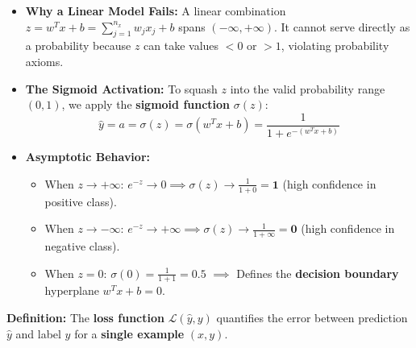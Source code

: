 \documentclass[10pt,a4paper]{article}
\begin{document}
\begin{itemize}[leftmargin=12pt, itemsep=1.5pt, topsep=1pt]
    \item \textbf{Why a Linear Model Fails:} A linear combination $z = w^T x + b = \sum_{j=1}^{n_x} w_j x_j + b$ spans $(-\infty, +\infty)$. It cannot serve directly as a probability because $z$ can take values $< 0$ or $> 1$, violating probability axioms.
    \item \textbf{The Sigmoid Activation:} To squash $z$ into the valid probability range $(0, 1)$, we apply the \textbf{sigmoid function} $\sigma(z)$:
    \[
    \hat{y} = a = \sigma(z) = \sigma(w^T x + b) = \frac{1}{1 + e^{-(w^T x + b)}}
    \]
    \item \textbf{Asymptotic Behavior:}
    \begin{itemize}[leftmargin=10pt, itemsep=0.5pt]
        \item When $z \to +\infty$: $e^{-z} \to 0 \implies \sigma(z) \to \frac{1}{1 + 0} = \mathbf{1}$ (high confidence in positive class).
        \item When $z \to -\infty$: $e^{-z} \to +\infty \implies \sigma(z) \to \frac{1}{1 + \infty} = \mathbf{0}$ (high confidence in negative class).
        \item When $z = 0$: $\sigma(0) = \frac{1}{1 + 1} = \mathbf{0.5}$ $\implies$ Defines the \textbf{decision boundary} hyperplane $w^T x + b = 0$.
    \end{itemize}
\end{itemize}

\vspace{1pt}

\par\vspace{2pt}
\textbf{Definition:} The \textbf{loss function} $\mathcal{L}(\hat{y}, y)$ quantifies the error between prediction $\hat{y}$ and label $y$ for a \textbf{single example} $(x, y)$.
\end{document}
